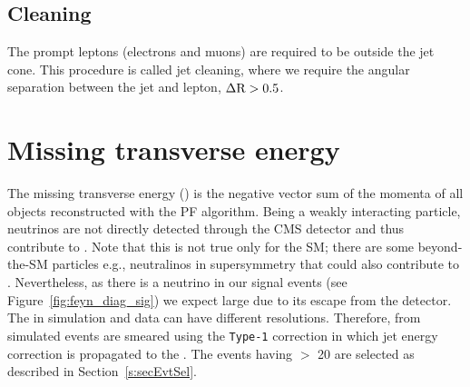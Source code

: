 \subsection{Cleaning}
The prompt leptons (electrons and muons) are required to be outside the jet cone.
This procedure is called jet cleaning, where we require the angular separation between the
jet and lepton, $\Delta \rm R > 0.5$.

\section{Missing transverse energy}
\label{s:secMET}
The missing transverse energy (\MET) is the negative vector sum of the momenta of all objects
reconstructed with the PF algorithm.
Being a weakly interacting particle, neutrinos are not directly detected through the CMS
detector and thus contribute to \MET.
Note that this is not true only for the SM; there are some beyond-the-SM particles e.g.,
neutralinos in supersymmetry that could also contribute to \MET.
Nevertheless, as there is a neutrino in our signal events (see Figure~\ref{fig:feyn_diag_sig})
we expect large \MET due to its escape from the detector.
The \MET in simulation and data can have different resolutions. Therefore, \MET from simulated events 
are smeared using the \verb|Type-1| correction in which jet energy correction is propagated to the 
\MET. The events having \MET $>$ 20 \GeV are selected as described in Section~\ref{s:secEvtSel}.
